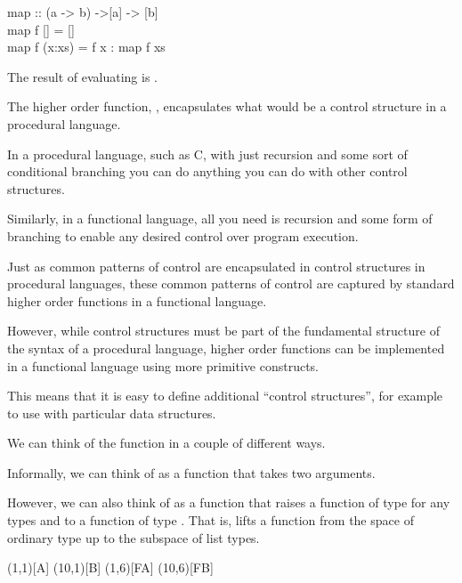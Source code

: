 \documentclass{seminar}
\begin{document}
\begin{slide}
\begin{code}
map :: (a -> b) ->[a] -> [b]\\
map f []     = []\\
map f (x:xs) = f x : map f xs
\end{code}

The result of evaluating 
\newline
is \textcdlr{[f x1, f x2, f x3]}.

The higher order function, , encapsulates what would be a
control structure in a procedural language.

\newslide

In a procedural language, such as C, with just recursion and some sort of conditional
branching you can do
anything you can do with other control structures.

Similarly, in a functional language, all you need is recursion and
some form of branching to enable any desired control over program
execution.

Just as common patterns of control are encapsulated in control structures in
procedural languages, these common patterns of control are captured by
standard higher order functions in a functional language.

However, while control structures must be part of the fundamental
structure of the syntax of a procedural language, higher order functions
can be implemented in a functional language using more primitive constructs.

This means that it is easy to define additional ``control structures'',
for example to use with particular data structures.

\newslide

We can think of the  function in a couple of different ways.

Informally, we can think of  as a function that takes two
arguments.

However, we can also think of  as a function that raises
a function of type
\newline
{} for any types  and
 to a function of type \textcdlr{[a] -> [b]}.  That
is,  lifts a function from the space of ordinary type up to
the subspace of list types.
\begin{cdiag}
\obj(1,1)[A]{}
\obj(10,1)[B]{}
\obj(1,6)[FA]{\textcd{[a]}}
\obj(10,6)[FB]{\textcd{[b]}}
\end{cdiag}


\end{slide}
\end{document}

